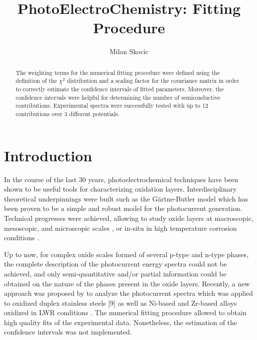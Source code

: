 \documentclass[10pt, 3p, sort&compress]{elsarticle}
\begin{document}
\begin{frontmatter}

\title{PhotoElectroChemistry: Fitting Procedure}
	
\author[1]{Milan Skocic}%

	
	
\begin{abstract}
The weighting terms for the numerical fitting procedure were defined using the definition of the $\chi ^2$ distribution and a scaling factor for the covariance matrix in order to correctly estimate the confidence intervals of fitted parameters. Moreover, the confidence intervals were helpful for determining the number of semiconductive contributions. Experimental spectra were successfully tested with up to 12 contributions over 3 different potentials.
\end{abstract}
	

\end{frontmatter}
	
\section{Introduction}

In the course of the last 30 years, photoelectrochemical techniques have been shown to be useful tools for characterizing oxidation layers. Interdisciplinary theoretical underpinnings were built \citep{morrison1980, vijh1969, stimming1986, diquarto1997, wouters2007} such as the Gärtne-Butler model \citep{gartner1959,butler1977} which has been proven to be a simple and robust model for the photocurrent generation. Technical progresses were achieved, allowing to study oxide layers at macroscopic, mesoscopic, and microscopic scales \citep{benaboud2007, srisrual2011}, or in-situ in high temperature corrosion conditions \citep{bojinov2002,skocic2016}.

Up to now, for complex oxide scales formed of several p-type and n-type phases, the complete description of the photocurrent energy spectra could not be achieved, and only semi-quantitative and/or partial information could be obtained on the nature of the phases present in the oxide layers. Recently, a new approach was proposed by \citet{petit2013} to analyze the photocurrent spectra which was applied to oxidized duplex stainless steels [9] as well as Ni-based and Zr-based alloys oxidized in LWR conditions \citep{skocic2016}. The numerical fitting procedure allowed to obtain high quality fits of the experimental data. Nonetheless, the estimation of the confidence intervals was not implemented.
\end{document}
